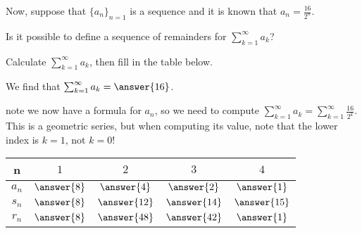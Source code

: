 \documentclass{ximera}
\begin{document}
\begin{exercise}
Now, suppose that $\{a_n\}_{n=1}$ is a sequence and it is known that $a_n = \frac{16}{2^n}$.

Is it possible to define a sequence of remainders for $\sum_{k=1}^{\infty} a_k$?

\begin{multipleChoice}
\end{multipleChoice}

\begin{exercise}
Calculate $\sum_{k=1}^{\infty} a_k$, then fill in the table below.

We find that $\sum_{k=1}^{\infty} a_k = \answer{16}$.

\begin{hint}
note we now have a formula for $a_n$, so we need to compute $\sum_{k=1}^{\infty} a_k=\sum_{k=1}^{\infty} \frac{16}{2^k}$.  This is a geometric series, but when computing its value, note that the lower index is $k=1$, not $k=0$!
\end{hint}

\begin{center}
\begin{tabular}{c | c | c | c | c }
n& $1$ & $2$ & $3$ & $4$ \\ [2 ex]
\hline
$a_n$ & $ \answer{8}$ &$ \answer{4}$ & $ \answer{2}$ & $ \answer{1}$  \\ [2 ex]
\hline
$s_n$ & $ \answer{8}$ &$ \answer{12}$ & $ \answer{14}$ & $ \answer{15}$  \\ [2 ex]
\hline
$r_n$ & $ \answer{8}$ & $ \answer{48}$ & $ \answer{42}$ & $ \answer{1}$ 
\end{tabular}
\end{center}

\end{exercise}
\end{exercise}
\end{document}
